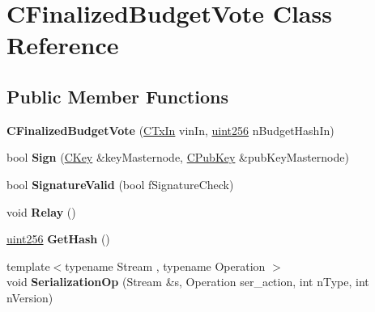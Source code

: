 \hypertarget{class_c_finalized_budget_vote}{}\section{C\+Finalized\+Budget\+Vote Class Reference}
\label{class_c_finalized_budget_vote}
\subsection*{Public Member Functions}
\begin{DoxyCompactItemize}
\item 
\mbox{\label{class_c_finalized_budget_vote_adc08bd33a9dde17ab5617d99d1f94f89}} 
{\bfseries C\+Finalized\+Budget\+Vote} (\mbox{\hyperlink{class_c_tx_in}{C\+Tx\+In}} vin\+In, \mbox{\hyperlink{classuint256}{uint256}} n\+Budget\+Hash\+In)
\item 
\mbox{\label{class_c_finalized_budget_vote_a4970328f02fd2ac5346edfa3c30a74e0}} 
bool {\bfseries Sign} (\mbox{\hyperlink{class_c_key}{C\+Key}} \&key\+Masternode, \mbox{\hyperlink{class_c_pub_key}{C\+Pub\+Key}} \&pub\+Key\+Masternode)
\item 
\mbox{\label{class_c_finalized_budget_vote_aadcc860c6efe5122388a372641297014}} 
bool {\bfseries Signature\+Valid} (bool f\+Signature\+Check)
\item 
\mbox{\label{class_c_finalized_budget_vote_a7c95f6ac01efc3975369bc7bdb8b83d0}} 
void {\bfseries Relay} ()
\item 
\mbox{\label{class_c_finalized_budget_vote_a517d29944e7c56809034f47ff2b91633}} 
\mbox{\hyperlink{classuint256}{uint256}} {\bfseries Get\+Hash} ()
\item 
\mbox{\label{class_c_finalized_budget_vote_a751d723816089e73debb2cdafea5699a}} 
{\footnotesize template$<$typename Stream , typename Operation $>$ }\\void {\bfseries Serialization\+Op} (Stream \&s, Operation ser\+\_\+action, int n\+Type, int n\+Version)
\end{DoxyCompactItemize}
